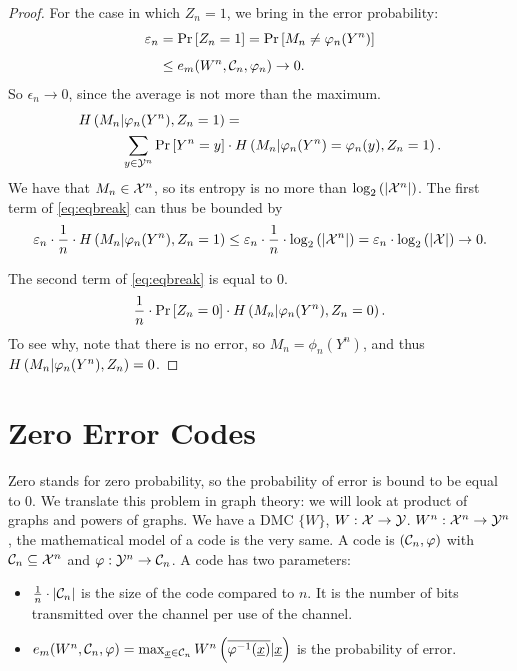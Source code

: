 \begin{proof}
	For the case in which $Z_n = 1$, we bring in the error probability:
	\begin{align*}
	  \varepsilon_n
	  & =
	  \mathop{\mathrm{Pr}}\limits_{} \left[ {Z_n = 1} \right] =
	  \mathop{\mathrm{Pr}}\limits_{} \left[ {M_n \neq \varphi_n(Y^n)} \right]
	  \\
	  & \le
	  e_m(W^n, \mathcal{C}_n, \varphi_n) \to 0.
	\end{align*}
	So $\epsilon_n \to 0$, since the average is not more than the maximum.
	\begin{align*}
		H\left({M_n | \varphi_n(Y^n), Z_n = 1}\right)
		& =
		\\
		\sum_{y \in \mathcal{Y}^n} \mathop{\mathrm{Pr}}\limits_{} \left[ {Y^n = y} \right]
		& \cdot
		H\left({M_n | \varphi_n(Y^n) = \varphi_n(y), Z_n = 1}\right).
	\end{align*}
	We have that $M_n \in \mathcal{X}^n$, so its entropy is no more than $\log_2 \left( {\left|{\mathcal{X}^n}\right|} \right)$.
	The first term of \cref{eq:eqbreak} can thus be bounded by
	\begin{equation*}
		\varepsilon_n \cdot
		\frac{1}{n} \cdot
		H\left({M_n | \varphi_n(Y^n), Z_n = 1}\right)
		\le
		\varepsilon_n \cdot
		\frac{1}{n} \cdot
		\log_2 \left( {\left|{\mathcal{X}^n}\right|} \right)
		=
		\varepsilon_n \cdot
		\log_2 \left( {\left|{\mathcal{X}}\right|} \right)
		\to 0.
	\end{equation*}

	The second term of \cref{eq:eqbreak} is equal to 0.
	\begin{equation*}
		\frac{1}{n} \cdot \mathop{\mathrm{Pr}}\limits_{} \left[ {Z_n = 0} \right] \cdot H\left({M_n | \varphi_n(Y^n), Z_n = 0}\right).
	\end{equation*}
	To see why, note that there is no error, so $M_n = \phi_n(Y^n)$, and thus $H\left({M_n | \varphi_n(Y^n), Z_n}\right) = 0$.
\end{proof}


\section{Zero Error Codes}

Zero stands for zero probability, so the probability of error is bound to be equal to 0.
We translate this problem in graph theory: we will look
at product of graphs and powers of graphs.
We have a \ac{DMC} $\{W\}$, $W : \mathcal{X} \to \mathcal{Y}$.
$W^n : \mathcal{X}^n \to \mathcal{Y}^n$, the mathematical model of a code is the very same.
A code is $(\mathcal{C}_n, \varphi)$ with $\mathcal{C}_n \subseteq \mathcal{X}^n$ and $\varphi: \mathcal{Y}^n \to \mathcal{C}_n$.
A code has two parameters:
\begin{itemize}
	\item $\frac{1}{n} \cdot \left|{\mathcal{C}_n}\right|$ is the size of the code compared to $n$.
		It is the number of bits transmitted over the channel per use of the channel.
	\item $e_m(W^n, \mathcal{C}_n, \varphi) = \max_{\underline{x} \in \mathcal{C}_n} W^n \left( \overline{\varphi^{-1}(\underline{x})} | \underline{x} \right)$ is the probability of error.
\end{itemize}

